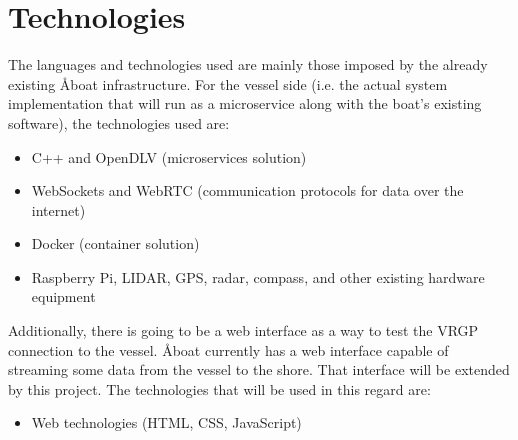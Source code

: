 \section{Technologies}\label{sec:technologies}

The languages and technologies used are mainly those imposed by the already existing Åboat infrastructure. For the vessel side (i.e. the actual system implementation that will run as a microservice along with the boat’s existing software), the technologies used are:

\begin{itemize}
	\item C++ and OpenDLV (microservices solution)
	\item WebSockets and WebRTC (communication protocols for data over the internet)
	\item Docker (container solution)
	\item Raspberry Pi, LIDAR, GPS, radar, compass, and other existing hardware equipment
\end{itemize}

\noindent
Additionally, there is going to be a web interface as a way to test the VRGP connection to the vessel. Åboat currently has a web interface capable of streaming some data from the vessel to the shore. That interface will be extended by this project. The technologies that will be used in this regard are:

\begin{itemize}
	\item Web technologies (HTML, CSS, JavaScript)
\end{itemize}
